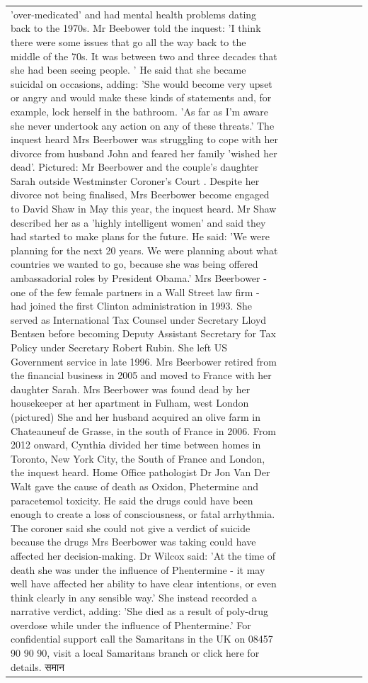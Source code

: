\begin{table}[H]
\begin{tabular}{lllrlllll}
'over-medicated' and had mental health problems dating back to the 1970s. Mr Beebower told the inquest: 'I think there were some issues that go all the way back to the middle of the 70s. It was between two and three decades that she had been seeing people. ' He said that she became suicidal on occasions, adding: 'She would become very upset or angry and would make these kinds of statements and, for example, lock herself in the bathroom. 'As far as I'm aware she never undertook any action on any of these threats.' The inquest heard Mrs Beerbower was struggling to cope with her divorce from husband John and feared her family 'wished her dead'. Pictured: Mr Beerbower and the couple's daughter Sarah outside Westminster Coroner's Court . Despite her divorce not being finalised, Mrs Beerbower become engaged to David Shaw in May this year, the inquest heard. Mr Shaw described her as a 'highly intelligent women' and said they had started to make plans for the future. He said: 'We were planning for the next 20 years. We were planning about what countries we wanted to go, because she was being offered ambassadorial roles by President Obama.' Mrs Beerbower - one of the few female partners in a Wall Street law firm - had joined the first Clinton administration in 1993. She served as International Tax Counsel under Secretary Lloyd Bentsen before becoming Deputy Assistant Secretary for Tax Policy under Secretary Robert Rubin. She left US Government service in late 1996. Mrs Beerbower retired from the financial business in 2005 and moved to France with her daughter Sarah. Mrs Beerbower was found dead by her housekeeper at her apartment in Fulham, west London (pictured) She and her husband acquired an olive farm in Chateauneuf de Grasse, in the south of France in 2006. From 2012 onward, Cynthia divided her time between homes in Toronto, New York City, the South of France and London, the inquest heard. Home Office pathologist Dr Jon Van Der Walt gave the cause of death as Oxidon, Phetermine and paracetemol toxicity. He said the drugs could have been enough to create a loss of consciousness, or fatal arrhythmia. The coroner said she could not give a verdict of suicide because the drugs Mrs Beerbower was taking could have affected her decision-making. Dr Wilcox said: 'At the time of death she was under the influence of Phentermine - it may well have affected her ability to have clear intentions, or even think clearly in any sensible way.' She instead recorded a narrative verdict, adding: 'She died as a result of poly-drug overdose while under the influence of Phentermine.' For confidential support call the Samaritans in the UK on 08457 90 90 90, visit a local Samaritans branch or click here for details. समान \\

\end{tabular}
\end{table}
